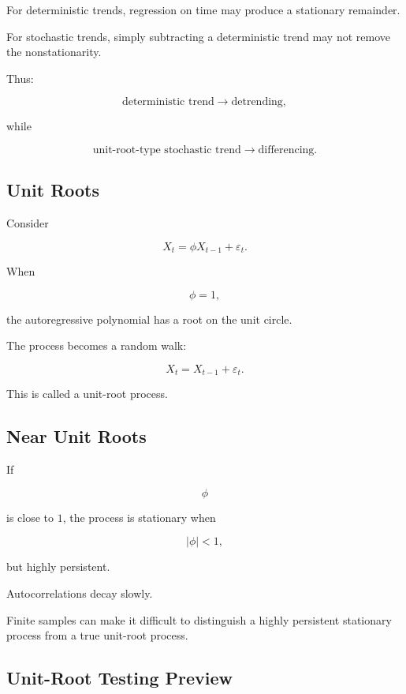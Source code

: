 For deterministic trends, regression on time may produce a stationary
remainder.

For stochastic trends, simply subtracting a deterministic trend may not
remove the nonstationarity.

Thus:

\[
\boxed{
\text{deterministic trend}
\rightarrow
\text{detrending},
}
\]

while

\[
\boxed{
\text{unit-root-type stochastic trend}
\rightarrow
\text{differencing}.
}
\]

\subsection{Unit Roots}
\label{subsec:unit-roots}

Consider

\[
X_t
=
\phi X_{t-1}
+
\varepsilon_t.
\]

When

\[
\boxed{
\phi=1,
}
\]

the autoregressive polynomial has a root on the unit circle.

The process becomes a random walk:

\[
\boxed{
X_t
=
X_{t-1}
+
\varepsilon_t.
}
\]

This is called a unit-root process.

\subsection{Near Unit Roots}
\label{subsec:near-unit-roots}

If

\[
\phi
\]

is close to \(1\), the process is stationary when

\[
|\phi|<1,
\]

but highly persistent.

Autocorrelations decay slowly.

Finite samples can make it difficult to distinguish a highly persistent
stationary process from a true unit-root process.

\subsection{Unit-Root Testing Preview}
\label{subsec:unit-root-testing-preview}

